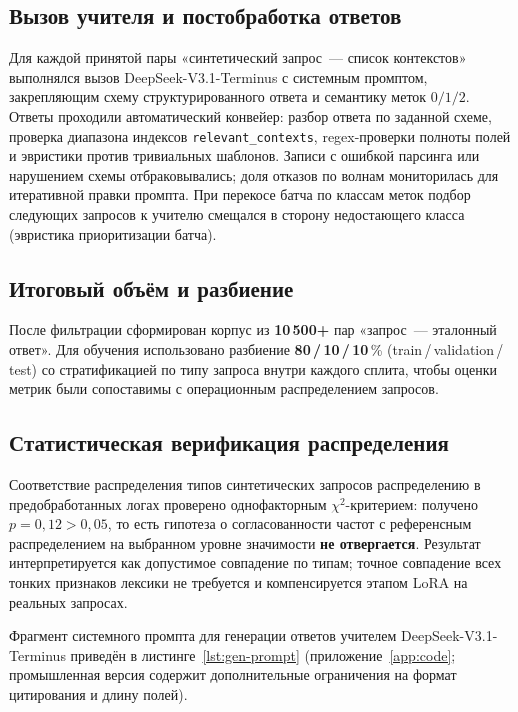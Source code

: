 \documentclass[times]{itmo-student-thesis}
\begin{document}
\subsection{Вызов учителя и постобработка ответов}

Для каждой принятой пары «синтетический запрос~--- список контекстов»
выполнялся вызов DeepSeek-V3.1-Terminus с системным промптом,
закрепляющим схему структурированного ответа и семантику меток $0/1/2$.
Ответы проходили автоматический конвейер: разбор ответа по заданной схеме,
проверка диапазона индексов \texttt{relevant\_contexts},
regex-проверки полноты полей и эвристики против тривиальных шаблонов.
Записи с ошибкой парсинга или нарушением схемы отбраковывались;
доля отказов по волнам мониторилась для итеративной правки промпта.
При перекосе батча по классам меток подбор следующих запросов к учителю
смещался в сторону недостающего класса (эвристика приоритизации батча).

\subsection{Итоговый объём и разбиение}

После фильтрации сформирован корпус из \textbf{10\,500+} пар
«запрос~--- эталонный ответ». Для обучения использовано разбиение
\textbf{80\,/\,10\,/\,10}\,\% (train\,/\,validation\,/\,test) со
стратификацией по типу запроса внутри каждого сплита, чтобы оценки
метрик были сопоставимы с операционным распределением запросов.

\subsection{Статистическая верификация распределения}

Соответствие распределения типов синтетических запросов распределению
в предобработанных логах проверено однофакторным $\chi^2$-критерием:
получено $p = 0{,}12 > 0{,}05$, то есть гипотеза о согласованности
частот с референсным распределением на выбранном уровне значимости
\textbf{не отвергается}. Результат интерпретируется как допустимое
совпадение по типам; точное совпадение всех тонких признаков лексики
не требуется и компенсируется этапом LoRA на реальных запросах.

Фрагмент системного промпта для генерации ответов учителем
DeepSeek-V3.1-Terminus приведён в листинге~\ref{lst:gen-prompt}
(приложение~\ref{app:code}; промышленная версия содержит дополнительные
ограничения на формат цитирования и длину полей).
\end{document}
